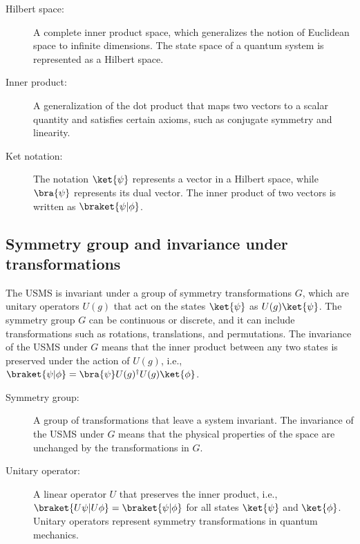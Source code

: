     \begin{tcolorbox}[colback=blue!5!white,colframe=blue!75!black,title=New terms]
        \begin{description}
            \item[Hilbert space:] A complete inner product space, which generalizes the notion of Euclidean space to infinite dimensions. The state space of a quantum system is represented as a Hilbert space.
            \item[Inner product:] A generalization of the dot product that maps two vectors to a scalar quantity and satisfies certain axioms, such as conjugate symmetry and linearity.
            \item[Ket notation:] The notation $\ket{\psi}$ represents a vector in a Hilbert space, while $\bra{\psi}$ represents its dual vector. The inner product of two vectors is written as $\braket{\psi|\phi}$.
        \end{description}
    \end{tcolorbox}

    \subsection{Symmetry group and invariance under transformations}
    The USMS is invariant under a group of symmetry transformations $G$, which are unitary operators $U(g)$ that act on the states $\ket{\psi}$ as $U(g)\ket{\psi}$. The symmetry group $G$ can be continuous or discrete, and it can include transformations such as rotations, translations, and permutations. The invariance of the USMS under $G$ means that the inner product between any two states is preserved under the action of $U(g)$, i.e., $\braket{\psi|\phi} = \bra{\psi}U(g)^\dagger U(g)\ket{\phi}$.

    \begin{tcolorbox}[colback=blue!5!white,colframe=blue!75!black,title=New terms]
        \begin{description}
            \item[Symmetry group:] A group of transformations that leave a system invariant. The invariance of the USMS under $G$ means that the physical properties of the space are unchanged by the transformations in $G$.
            \item[Unitary operator:] A linear operator $U$ that preserves the inner product, i.e., $\braket{U\psi|U\phi} = \braket{\psi|\phi}$ for all states $\ket{\psi}$ and $\ket{\phi}$. Unitary operators represent symmetry transformations in quantum mechanics.
        \end{description}
    \end{tcolorbox}


